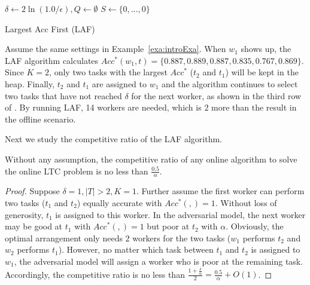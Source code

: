 \begin{algorithm}[t]
	$\delta \leftarrow 2\ln{(1.0/\epsilon)}, Q \leftarrow \emptyset$\;
	$S \leftarrow \{0,\ldots,0\}$ 
\caption{Largest Acc First (LAF)}
\label{alg:LAF}
\end{algorithm}

\begin{example}
Assume the same settings in Example~\ref{exa:introExa}.
When $w_1$ shows up, the LAF algorithm calculates $Acc^*(w_1,t) = \{0.887,0.889,0.887,0.835,0.767,0.869\}$.
Since $K=2$, only two tasks with the largest $Acc^{*}$ (\ie $t_2$ and $t_1$) will be kept in the heap.
Finally, $t_2$ and $t_1$ are assigned to $w_1$ and the algorithm continues to select two tasks that have not reached $\delta$ for the next worker, as shown in the third row of .
By running LAF, 14 workers are needed, which is 2 more than the result in the offline scenario.
\end{example}

Next we study the competitive ratio of the LAF algorithm.

\begin{theorem}
\label{thm:ubCR}
Without any assumption, the competitive ratio of any online algorithm to solve the online LTC problem is no less than $\frac{0.5}{\alpha}$.
\end{theorem}
\begin{proof}
Suppose $\delta = 1, |T| > 2, K = 1$.
Further assume the first worker can perform two tasks ($t_1$ and $t_2$) equally accurate with $Acc^{*}(,) = 1$.
Without loss of generosity, $t_1$ is assigned to this worker.
In the adversarial model, the next worker may be good at $t_1$ with $Acc^{*}(,) = 1$ but poor at $t_2$ with $\alpha$.
Obviously, the optimal arrangement only needs $2$ workers for the two tasks ($w_1$ performs $t_2$ and $w_2$ performs $t_1$).
However, no matter which task between $t_1$ and $t_2$ is assigned to $w_1$, the adversarial model will assign a worker who is poor at the remaining task.
Accordingly, the competitive ratio is no less than $\frac{1+\frac{\delta}{\alpha}}{2} = \frac{0.5}{\alpha} + O(1)$.
\end{proof}

